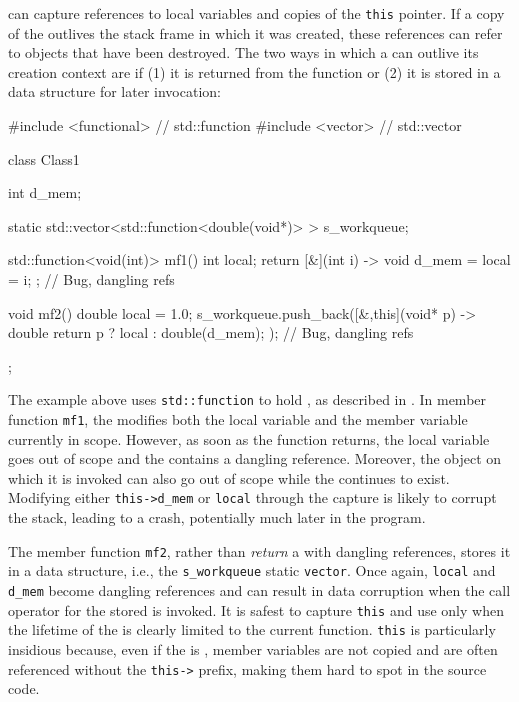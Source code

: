  can capture references to local variables and
copies of the \lstinline!this! pointer. If a copy of the  outlives the stack frame in which it was created, these
references can refer to objects that have been destroyed. The two ways
in which a  can outlive its creation context are
if (1) it is returned from the function or (2) it is stored in a data
structure for later invocation:

\begin{emcppslisting}
#include <functional>  // std::function
#include <vector>      // std::vector

class Class1
{
    int d_mem;

    static std::vector<std::function<double(void*)> > s_workqueue;

    std::function<void(int)> mf1()
    {
        int local;
        return [&](int i) -> void { d_mem = local = i; };  // Bug, dangling refs
    }

    void mf2()
    {
        double local = 1.0;
        s_workqueue.push_back([&,this](void* p) -> double {
                return p ? local : double(d_mem);
            });  // Bug, dangling refs
    }
};
\end{emcppslisting}
    

\noindent The example above uses \lstinline!std::function! to hold , as described in . In member
function \lstinline!mf1!, the  modifies both the local
variable and the member variable currently in scope. However, as soon as
the function returns, the local variable goes out of scope and the
 contains a dangling reference. Moreover, the object on
which it is invoked can also go out of scope while the  continues to exist. Modifying either \lstinline!this->d_mem! or
\lstinline!local! through the capture is likely to corrupt the stack,
leading to a crash, potentially much later in the program.

The member function \lstinline!mf2!, rather than \emph{return} a
 with dangling references, stores it in a data
structure, i.e., the \lstinline!s_workqueue! static \lstinline!vector!. Once
again, \lstinline!local! and \lstinline!d_mem! become dangling references and
can result in data corruption when the call operator for the stored
 is invoked. It is safest to capture
\lstinline!this! and use  only when the
lifetime of the  is clearly limited to the
current function.  \lstinline!this! is
particularly insidious because, even if the  is
, member variables are not copied and are often
referenced without the \lstinline!this->! prefix, making them hard to spot
in the source code.


